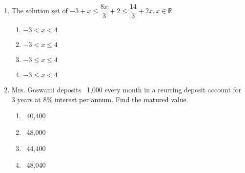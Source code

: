 \begin{enumerate}[label=(\roman*)]
        \begin{multicols}{2}
        \begin{enumerate}[label=(\alph*)]
            \item $\begin{bmatrix*}[r] 4 & -4 \\ 8  & -8 \end{bmatrix*}$
            \item $\begin{bmatrix*}[r] 4 &  8 \\ -4 & -8 \end{bmatrix*}$
            \item $\begin{bmatrix*}[r] -4 & 4 \\ -8 &  8 \end{bmatrix*}$
            \item $\begin{bmatrix*}[r] -4 & 4 \\ 8  & -8 \end{bmatrix*}$
        \end{enumerate}
        \end{multicols}

    \item The solution set of $-3 + x \leq \dfrac{8x}{3} + 2 \leq \dfrac{14}{3} + 2x, 
        x \in \mathbb{R}$

        \begin{multicols}{2}
        \begin{enumerate}[label=(\alph*)]
            \item $-3 < x < 4$
            \item $-3 < x \leq 4$
            \item $-3 \leq x \leq 4$
            \item $-3 \leq x < 4$
        \end{enumerate}
        \end{multicols}

    \item Mrs. Goswami deposits \rupee~1,000 every month in a reurring deposit 
        account for 3 years at 8\% interest per annum. Find the matured value.

        \begin{multicols}{2}
        \begin{enumerate}[label=(\alph*)]
            \item \rupee~40,400 
            \item \rupee~48,000 
            \item \rupee~44,400 
            \item \rupee~48,040 
        \end{enumerate}
        \end{multicols}

\end{enumerate}


